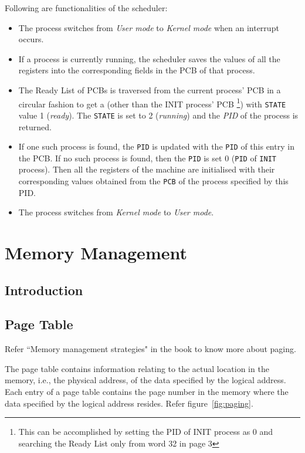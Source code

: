 \documentclass[11pt]{report}
\begin{document}
Following are functionalities of the scheduler:
\begin{itemize}
	\item The process switches from \textit{User mode} to \textit{Kernel mode} when an interrupt occurs.
	\item If a process is currently running, the scheduler saves the values of all the registers into the corresponding fields in the PCB of that process.
	\item The Ready List of PCBs is traversed from the current process' PCB in a circular fashion to get a (other than the INIT process' PCB \footnote{This can be accomplished by setting the PID of INIT process as 0 and searching  the Ready List only from word 32 in page 3}) with \texttt{STATE} value 1 (\textit{ready}). The \texttt{STATE} is set to 2 (\textit{running}) and the \textit{PID} of the process is returned.
	\item If one such process is found, the \texttt{PID} is updated with the \texttt{PID} of this entry in the PCB. If no such process is found, then the \texttt{PID} is set 0 (\texttt{PID} of \texttt{INIT} process). Then all the registers of the machine are initialised with their corresponding values obtained from the \texttt{PCB} of the process specified by this PID.
	
	\item The process switches from \textit{Kernel mode} to \textit{User mode}.
\end{itemize}

\chapter{Memory Management}
\section{Introduction}

\section{Page Table}


Refer ``Memory management strategies" in the book \cite{galvin} to know more about paging. 

The page table contains information relating to the actual location in the memory, i.e., the physical address, of the data specified by the logical address. Each entry of a page table contains the page number in the memory where the data specified by the logical address resides. Refer figure~\ref{fig:paging}.
\end{document}
